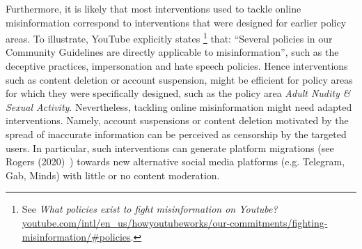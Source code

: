 \documentclass{article}
\begin{document}
Furthermore, it is likely that most interventions used to tackle online misinformation correspond to interventions that were designed for earlier policy areas.
To illustrate, YouTube explicitly states
\footnote{See {\it What policies exist to fight misinformation on Youtube?} \href{https://www.youtube.com/intl/en\_us/howyoutubeworks/our-commitments/fighting-misinformation/\#policies}{youtube.com/intl/en\_us/howyoutubeworks/our-commitments/fighting-misinformation/\#policies}.}
that: ``Several policies in our Community Guidelines are directly applicable to misinformation'', such as the deceptive practices, impersonation and hate speech policies.
Hence interventions such as content deletion or account suspension, might be efficient for policy areas for which they were specifically designed, such as the policy area {\it Adult Nudity \& Sexual Activity}. Nevertheless, tackling online misinformation might need adapted interventions.
Namely, account suspensions or content deletion motivated by the spread of inaccurate information can be perceived as censorship by the targeted users. In particular, such interventions can generate platform migrations (see Rogers (2020)~\cite{rogers2020}) towards new alternative social media platforms (e.g. Telegram, Gab, Minds) with little or no content moderation.

\smallskip
\end{document}
